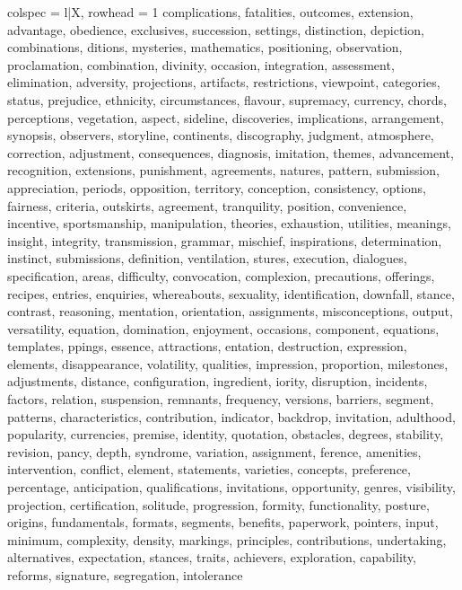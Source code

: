 \begin{tblr}[
  long,
  caption = {Examples from SNLI.},
  entry = {Short Caption},
  label = {tblr:test},
]{
colspec = {l|X},
rowhead = 1}
complications, fatalities, outcomes, extension, advantage, obedience, exclusives, succession, settings, distinction, depiction, combinations, ditions, mysteries, mathematics, positioning, observation, proclamation, combination, divinity, occasion, integration, assessment, elimination, adversity, projections, artifacts, restrictions, viewpoint, categories, status, prejudice, ethnicity, circumstances, flavour, supremacy, currency, chords, perceptions, vegetation, aspect, sideline, discoveries, implications, arrangement, synopsis, observers, storyline, continents, discography, judgment, atmosphere, correction, adjustment, consequences, diagnosis, imitation, themes, advancement, recognition, extensions, punishment, agreements, natures, pattern, submission, appreciation, periods, opposition, territory, conception, consistency, options, fairness, criteria, outskirts, agreement, tranquility, position, convenience, incentive, sportsmanship, manipulation, theories, exhaustion, utilities, meanings, insight, integrity, transmission, grammar, mischief, inspirations, determination, instinct, submissions, definition, ventilation, stures, execution, dialogues, specification, areas, difficulty, convocation, complexion, precautions, offerings, recipes, entries, enquiries, whereabouts, sexuality, identification, downfall, stance, contrast, reasoning, mentation, orientation, assignments, misconceptions, output, versatility, equation, domination, enjoyment, occasions, component, equations, templates, ppings, essence, attractions, entation, destruction, expression, elements, disappearance, volatility, qualities, impression, proportion, milestones, adjustments, distance, configuration, ingredient, iority, disruption, incidents, factors, relation, suspension, remnants, frequency, versions, barriers, segment, patterns, characteristics, contribution, indicator, backdrop, invitation, adulthood, popularity, currencies, premise, identity, quotation, obstacles, degrees, stability, revision, pancy, depth, syndrome, variation, assignment, ference, amenities, intervention, conflict, element, statements, varieties, concepts, preference, percentage, anticipation, qualifications, invitations, opportunity, genres, visibility, projection, certification, solitude, progression, formity, functionality, posture, origins, fundamentals, formats, segments, benefits, paperwork, pointers, input, minimum, complexity, density, markings, principles, contributions, undertaking, alternatives, expectation, stances, traits, achievers, exploration, capability, reforms, signature, segregation, intolerance \\\midrule

\end{tblr}
